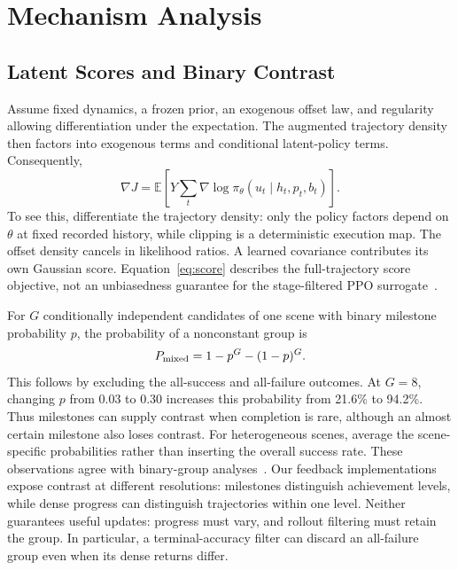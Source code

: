 \section{Mechanism Analysis}\label{sec:theory}
\subsection{Latent Scores and Binary Contrast}
Assume fixed dynamics, a frozen prior, an exogenous offset law, and regularity allowing differentiation under the expectation. The augmented trajectory density then factors into exogenous terms and conditional latent-policy terms. Consequently,
\begin{equation}
\nabla J=\mathbb E\!\left[Y\sum_t\nabla\log\pi_\theta(u_t\mid h_t,p_t,b_t)\right].
\label{eq:score}
\end{equation}
To see this, differentiate the trajectory density: only the policy factors depend on $\theta$ at fixed recorded history, while clipping is a deterministic execution map. The offset density cancels in likelihood ratios. A learned covariance contributes its own Gaussian score. Equation~\eqref{eq:score} describes the full-trajectory score objective, not an unbiasedness guarantee for the stage-filtered PPO surrogate~\cite{capg}.

For $G$ conditionally independent candidates of one scene with binary milestone probability $p$, the probability of a nonconstant group is
\begin{equation}
P_{\rm mixed}=1-p^G-(1-p)^G.
\label{eq:mixed}
\end{equation}
This follows by excluding the all-success and all-failure outcomes. At $G=8$, changing $p$ from 0.03 to 0.30 increases this probability from 21.6\% to 94.2\%. Thus milestones can supply contrast when completion is rare, although an almost certain milestone also loses contrast. For heterogeneous scenes, average the scene-specific probabilities rather than inserting the overall success rate. These observations agree with binary-group analyses~\cite{mroueh2026,bay2026}. Our feedback implementations expose contrast at different resolutions: milestones distinguish achievement levels, while dense progress can distinguish trajectories within one level. Neither guarantees useful updates: progress must vary, and rollout filtering must retain the group. In particular, a terminal-accuracy filter can discard an all-failure group even when its dense returns differ.

